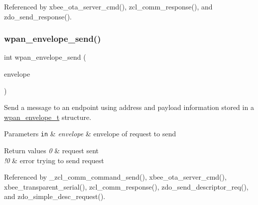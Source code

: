 Referenced by xbee\+\_\+ota\+\_\+server\+\_\+cmd(), zcl\+\_\+comm\+\_\+response(), and zdo\+\_\+send\+\_\+response().

\mbox{\label{group__wpan__aps_ga06f1e9e86b74ef807ded44b79b13e283}} 
\subsubsection{\texorpdfstring{wpan\+\_\+envelope\+\_\+send()}{wpan\_envelope\_send()}}
{\footnotesize\ttfamily int wpan\+\_\+envelope\+\_\+send (\begin{DoxyParamCaption}\item[{const \hyperlink{structwpan__envelope__t}{wpan\+\_\+envelope\+\_\+t} \hyperlink{group__hal_gaef060b3456fdcc093a7210a762d5f2ed}{F\+AR} $\ast$}]{envelope }\end{DoxyParamCaption})}



Send a message to an endpoint using address and payload information stored in a \hyperlink{structwpan__envelope__t}{wpan\+\_\+envelope\+\_\+t} structure. 


\begin{DoxyParams}[1]{Parameters}
\mbox{\tt in}  & {\em envelope} & envelope of request to send\\
\hline
\end{DoxyParams}

\begin{DoxyRetVals}{Return values}
{\em 0} & request sent \\
\hline
{\em !0} & error trying to send request \\
\hline
\end{DoxyRetVals}


Referenced by \+\_\+zcl\+\_\+comm\+\_\+command\+\_\+send(), xbee\+\_\+ota\+\_\+server\+\_\+cmd(), xbee\+\_\+transparent\+\_\+serial(), zcl\+\_\+comm\+\_\+response(), zdo\+\_\+send\+\_\+descriptor\+\_\+req(), and zdo\+\_\+simple\+\_\+desc\+\_\+request().

\mbox{\label{group__wpan__aps_ga1254464011d2d98c13db7b0b3d41c25b}} 
